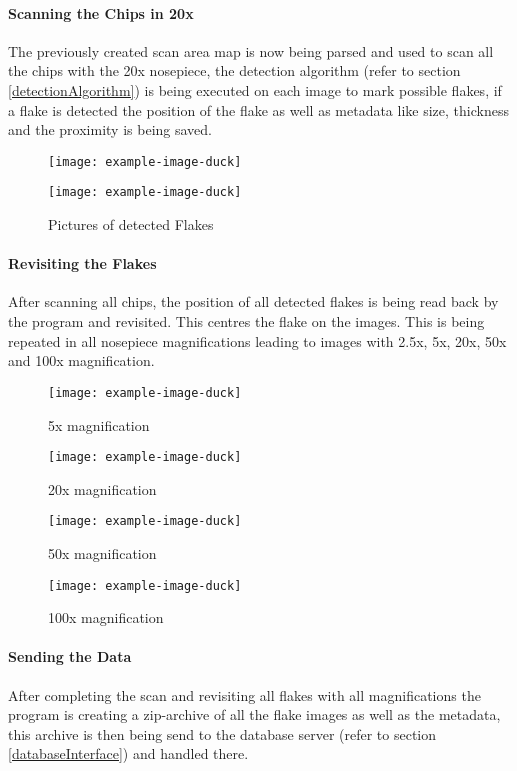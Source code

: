 \paragraph{Scanning the Chips in 20x}
The previously created scan area map is now being parsed and used to scan all the chips with the 20x nosepiece, the detection algorithm (refer to section \ref{detectionAlgorithm}) is being executed on each image to mark possible flakes, if a flake is detected the position of the flake as well as metadata like size, thickness and the proximity is being saved.

\begin{figure}[!h]
\centering
\begin{minipage}{.45\textwidth}
  \centering
  \texttt{[image: example-image-duck]}
\end{minipage}
\begin{minipage}{.45\textwidth}
  \centering
  \texttt{[image: example-image-duck]}
\end{minipage}
\caption{Pictures of detected Flakes}
\end{figure}

\paragraph{Revisiting the Flakes}
After scanning all chips, the position of all detected flakes is being read back by the program and revisited. This centres the flake on the images. This is being repeated in all nosepiece magnifications leading to images with 2.5x, 5x, 20x, 50x and 100x magnification.

\begin{figure}[!h]
\centering
\begin{minipage}{.45\textwidth}
  \centering
  \texttt{[image: example-image-duck]}
  \caption{5x magnification}
\end{minipage}
\begin{minipage}{.45\textwidth}
  \centering
  \texttt{[image: example-image-duck]}
    \caption{20x magnification}
\end{minipage}

\vspace{10px}

\begin{minipage}{.45\textwidth}
  \centering
  \texttt{[image: example-image-duck]}
  \caption{50x magnification}
\end{minipage}
\begin{minipage}{.45\textwidth}
  \centering
  \texttt{[image: example-image-duck]}
    \caption{100x magnification}
\end{minipage}
\end{figure}

\paragraph{Sending the Data}
After completing the scan and revisiting all flakes with all magnifications the program is creating a zip-archive of all the flake images as well as the metadata, this archive is then being send to the database server (refer to section \ref{databaseInterface}) and handled there.